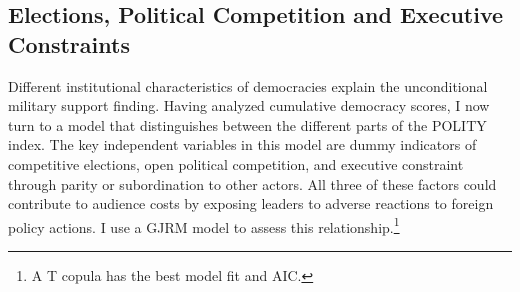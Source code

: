 \documentclass[12pt]{article}
\begin{document}
\subsection{Elections, Political Competition and Executive Constraints} 


Different institutional characteristics of democracies explain the unconditional military support finding. 
Having analyzed cumulative democracy scores, I now turn to a model that distinguishes between the different parts of the POLITY index. 
The key independent variables in this model are dummy indicators of competitive elections, open political competition, and executive constraint through parity or subordination to other actors. 
All three of these factors could contribute to audience costs by exposing leaders to adverse reactions to foreign policy actions. 
I use a GJRM model to assess this relationship.\footnote{A T copula has the best model fit and AIC.} 
\end{document}
